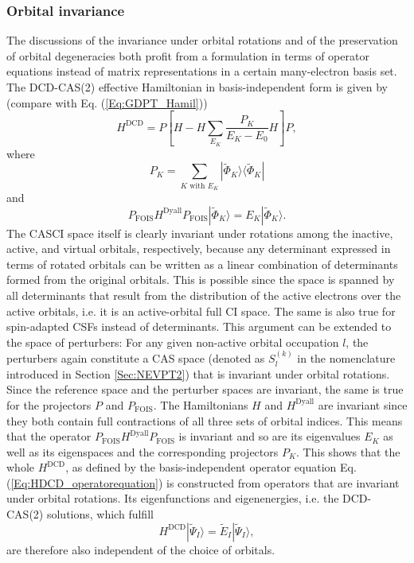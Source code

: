 \subsubsection{Orbital invariance}
\label{Ap:OrbitalInv}
The discussions of the invariance under orbital rotations and of the preservation of orbital degeneracies both profit from a formulation in terms of operator equations instead of matrix representations in a certain many-electron basis set. The DCD-CAS(2) effective Hamiltonian in basis-independent form is given by (compare with Eq. (\ref{Eq:GDPT_Hamil}))
\begin{equation}
\label{Eq:HDCD_operatorequation}
	{H^{{\text{DCD}}}} = {P}\left[ {H - H\sum\limits_{{E_K}} {\frac{{{P_K}}}{{{E_K} - {E_0}}}} H} \right]{P},
\end{equation}
where
\begin{equation}
P_K = \sum_{K\text{ with }E_K} |\tilde{\Phi}_K\rangle \langle \tilde{\Phi}_K|
\end{equation}
and
\begin{equation}
P_\text{FOIS}H^\text{Dyall}P_\text{FOIS}|\tilde{\Phi}_K\rangle = E_K |\tilde{\Phi}_K\rangle.
\end{equation}
The CASCI space itself is clearly invariant under rotations among the inactive, active, and virtual orbitals, respectively, because any determinant expressed in terms of rotated orbitals can be written as a linear combination of determinants formed from the original orbitals. This is possible since the space is spanned by all determinants that result from the distribution of the active electrons over the active orbitals, i.e. it is an active-orbital full CI space. The same is also true for spin-adapted CSFs instead of determinants. This argument can be extended to the space of perturbers: For any given non-active orbital occupation $l$, the perturbers again constitute a CAS space (denoted as $S_l^{(k)}$ in the nomenclature introduced in Section \ref{Sec:NEVPT2}) that is invariant under orbital rotations.
Since the reference space and the perturber spaces are invariant, the same is true for the projectors ${P}$ and $P_\text{FOIS}$. The Hamiltonians $H$ and $H^\text{Dyall}$ are invariant since they both contain full contractions of all three sets of orbital indices.\cite{Kong_2010_2603} This means that the operator  $P_\text{FOIS}H^\text{Dyall}P_\text{FOIS}$ is invariant and so are its eigenvalues $E_K$ as well as its eigenspaces and the corresponding projectors ${P_K}$. This shows that the whole $H^\text{DCD}$, as defined by the basis-independent operator equation Eq. (\ref{Eq:HDCD_operatorequation}) is constructed from operators that are invariant under orbital rotations. Its eigenfunctions and eigenenergies, i.e. the DCD-CAS(2) solutions, which fulfill
\begin{equation}
H^\text{DCD} |\tilde{\Psi}_I\rangle = \tilde{E}_I |\tilde{\Psi}_I\rangle,
\end{equation}
are therefore also independent of the choice of orbitals.

